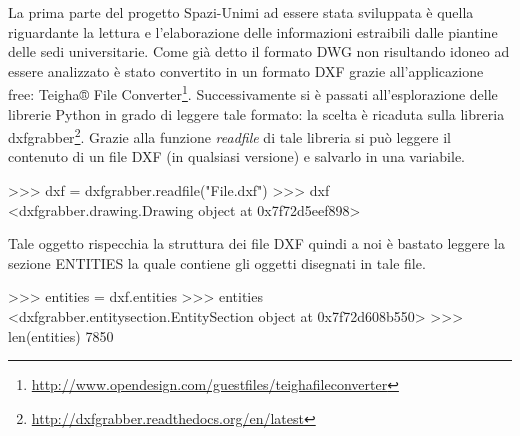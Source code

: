\documentclass[12pt]{report}
\begin{document}
La prima parte del progetto Spazi-Unimi ad essere stata sviluppata è quella riguardante la lettura e l'elaborazione delle informazioni estraibili dalle piantine delle sedi universitarie. Come già detto il formato DWG non risultando idoneo ad essere analizzato è stato convertito in un formato DXF grazie all'applicazione free: Teigha® File Converter\footnote{\url{http://www.opendesign.com/guestfiles/teighafileconverter}}. 
Successivamente si è passati all'esplorazione delle librerie Python in grado di leggere tale formato: la scelta è ricaduta sulla libreria dxfgrabber\footnote{\url{http://dxfgrabber.readthedocs.org/en/latest}}. Grazie alla funzione \textit{readfile} di tale libreria si può leggere il contenuto di un file DXF (in qualsiasi versione) e salvarlo in una variabile.
\begin{python}[title=Lettura di un file DXF con dxfgrabber, frame=single]
>>> dxf = dxfgrabber.readfile("File.dxf")
>>> dxf
<dxfgrabber.drawing.Drawing object at 0x7f72d5eef898>
\end{python}


\vspace{5mm} %

Tale oggetto rispecchia la struttura dei file DXF quindi a noi è bastato leggere la sezione ENTITIES la quale contiene gli oggetti disegnati in tale file.
\begin{python}[title=Salvataggio delle entità di un file DXF, frame=single]
>>> entities = dxf.entities
>>> entities
<dxfgrabber.entitysection.EntitySection object at 0x7f72d608b550>
>>> len(entities)
7850
\end{python}

\vspace{5mm} %
\end{document}
